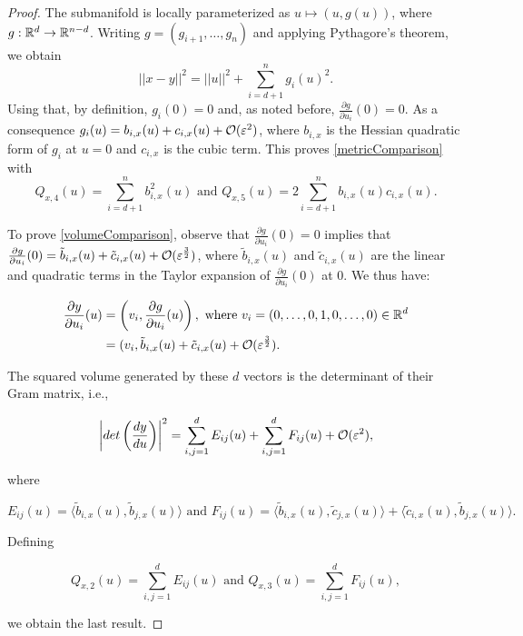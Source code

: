 \begin{proof}
The submanifold is locally parameterized as $u\mapsto(u,g(u))$, where $g:\mathbb{R}^d\rightarrow\mathbb{R}^{n-d}$. Writing $g=(g_{i+1},\dots,g_n)$ and applying Pythagore's theorem, we obtain
\begin{equation*}
||x-y||^2=||u||^2+\sum_{i=d+1}^n g_i(u)^2.
\end{equation*}
Using that, by definition, $g_i(0)=0$ and, as noted before, $\frac{\partial g}{\partial u_i}(0)=0$. As a consequence $g_i(u)=b_{i,x}(u)+c_{i,x}(u)+\mathcal{O}(\varepsilon^2)$, where $b_{i,x}$ is the Hessian quadratic form of $g_i$ at $u=0$ and $c_{i,x}$ is the cubic term. This proves \eqref{metricComparison} with
\begin{equation*}
Q_{x,4}(u)=\sum_{i=d+1}^n b_{i,x}^2(u) \text{ and } Q_{x,5}(u)=2\sum_{i=d+1}^n b_{i,x}(u)c_{i,x}(u).
\end{equation*}

To prove \eqref{volumeComparison}, observe that $\frac{\partial g}{\partial u_i}(0)=0$ implies that $\frac{\partial g}{\partial u_i}(0)=\tilde{b}_{i,x}(u)+\tilde{c}_{i,x}(u)+\mathcal{O}(\varepsilon^\frac{3}{2})$, where $\tilde{b}_{i,x}(u)$ and $\tilde{c}_{i,x}(u)$ are the linear and quadratic terms in the Taylor expansion of $\frac{\partial g}{\partial u_i}(0)$ at $0$. We thus have:

\begin{equation*}\begin{aligned}
\frac{\partial y}{\partial u_i}(u)&=\left(v_i,\frac{\partial g}{\partial u_i}(u)\right), \text{ where } v_i=(0,\dots,0,1,0,\dots,0)\in\mathbb{R}^d \\
&=(v_i,\tilde{b}_{i,x}(u)+\tilde{c}_{i,x}(u)+\mathcal{O}(\varepsilon^\frac{3}{2}).
\end{aligned}\end{equation*}

The squared volume generated by these $d$ vectors is the determinant of their Gram matrix, i.e.,

\begin{equation*}
\left| det\left(\frac{dy}{du} \right)\right|^2=\sum_{i,j=1}^d E_{ij}(u)+\sum_{i,j=1}^d F_{ij}(u)+\mathcal{O}(\varepsilon^2),
\end{equation*}

where

\begin{equation*}
E_{ij}(u)=\langle \tilde{b}_{i,x}(u),\tilde{b}_{j,x}(u)\rangle \text{ and } F_{ij}(u)=\langle \tilde{b}_{i,x}(u),\tilde{c}_{j,x}(u)\rangle + \langle \tilde{c}_{i,x}(u),\tilde{b}_{j,x}(u)\rangle.
\end{equation*}

Defining

\begin{equation*}
Q_{x,2}(u)=\sum_{i,j=1}^d E_{ij}(u) \text{ and } Q_{x,3}(u)=\sum_{i,j=1}^d F_{ij}(u),
\end{equation*}

we obtain the last result.
\end{proof}



